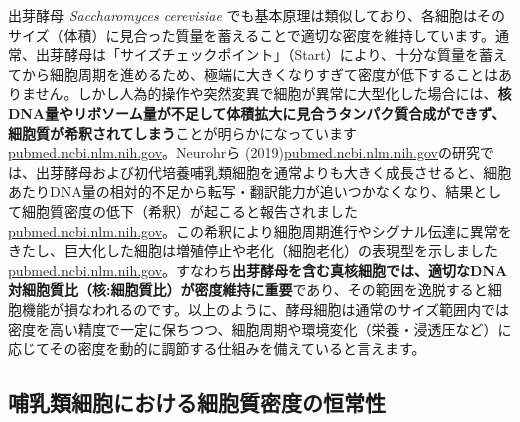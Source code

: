 出芽酵母 \textit{Saccharomyces cerevisiae} でも基本原理は類似しており、各細胞はそのサイズ（体積）に見合った質量を蓄えることで適切な密度を維持しています。通常、出芽酵母は「サイズチェックポイント」（Start）により、十分な質量を蓄えてから細胞周期を進めるため、極端に大きくなりすぎて密度が低下することはありません。しかし人為的操作や突然変異で細胞が異常に大型化した場合には、\textbf{核DNA量やリボソーム量が不足して体積拡大に見合うタンパク質合成ができず、細胞質が希釈されてしまう}ことが明らかになっています\href{https://pubmed.ncbi.nlm.nih.gov/30739799/\#:~:text=impairs\%20gene\%20induction\%2C\%20cell,loss\%20of\%20scaling\%20beyond\%20a}{pubmed.ncbi.nlm.nih.gov}。Neurohrら (2019)\href{https://pubmed.ncbi.nlm.nih.gov/30739799/\#:~:text=that\%20growing\%20budding\%20yeast\%20and,outside\%20these\%20bounds\%20contribute\%20to}{pubmed.ncbi.nlm.nih.gov}の研究では、出芽酵母および初代培養哺乳類細胞を通常よりも大きく成長させると、細胞あたりDNA量の相対的不足から転写・翻訳能力が追いつかなくなり、結果として細胞質密度の低下（希釈）が起こると報告されました\href{https://pubmed.ncbi.nlm.nih.gov/30739799/\#:~:text=that\%20growing\%20budding\%20yeast\%20and,outside\%20these\%20bounds\%20contribute\%20to}{pubmed.ncbi.nlm.nih.gov}。この希釈により細胞周期進行やシグナル伝達に異常をきたし、巨大化した細胞は増殖停止や老化（細胞老化）の表現型を示しました\href{https://pubmed.ncbi.nlm.nih.gov/30739799/\#:~:text=that\%20growing\%20budding\%20yeast\%20and,outside\%20these\%20bounds\%20contribute\%20to}{pubmed.ncbi.nlm.nih.gov}。すなわち\textbf{出芽酵母を含む真核細胞では、適切なDNA対細胞質比（核:細胞質比）が密度維持に重要}であり、その範囲を逸脱すると細胞機能が損なわれるのです。以上のように、酵母細胞は通常のサイズ範囲内では密度を高い精度で一定に保ちつつ、細胞周期や環境変化（栄養・浸透圧など）に応じてその密度を動的に調節する仕組みを備えていると言えます。

\subsection{哺乳類細胞における細胞質密度の恒常性}

